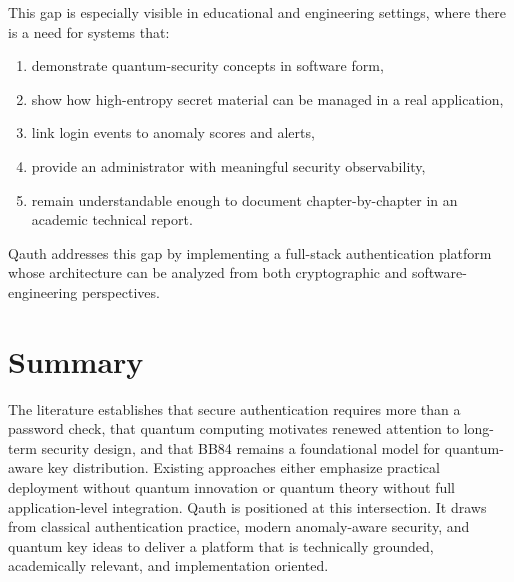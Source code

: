 This gap is especially visible in educational and engineering settings, where there is a need for systems that:

\begin{enumerate}
    \item demonstrate quantum-security concepts in software form,
    \item show how high-entropy secret material can be managed in a real application,
    \item link login events to anomaly scores and alerts,
    \item provide an administrator with meaningful security observability,
    \item remain understandable enough to document chapter-by-chapter in an academic technical report.
\end{enumerate}

Qauth addresses this gap by implementing a full-stack authentication platform whose architecture can be analyzed from both cryptographic and software-engineering perspectives.

\section{Summary}
The literature establishes that secure authentication requires more than a password check, that quantum computing motivates renewed attention to long-term security design, and that BB84 remains a foundational model for quantum-aware key distribution. Existing approaches either emphasize practical deployment without quantum innovation or quantum theory without full application-level integration. Qauth is positioned at this intersection. It draws from classical authentication practice, modern anomaly-aware security, and quantum key ideas to deliver a platform that is technically grounded, academically relevant, and implementation oriented.

